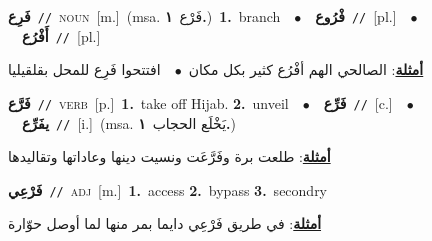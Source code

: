 \documentclass[10pt,a4paper,twoside]{article} %
\begin{document}
\begin{multicols}{2}
{\setlength\topsep{0pt}\textbf{\foreignlanguage{arabic}{فَرِع}}\ {\color{gray}\texttt{//}\color{black}}\ \textsc{noun}\ [m.]\ \color{gray}(msa. \foreignlanguage{arabic}{فَرْع}~\foreignlanguage{arabic}{\textbf{١.}})\color{black}\ \textbf{1.}~branch\ \ $\bullet$\ \ \setlength\topsep{0pt}\textbf{\foreignlanguage{arabic}{فْرُوع}}\ {\color{gray}\texttt{//}\color{black}}\ [pl.]\ \ $\bullet$\ \ \setlength\topsep{0pt}\textbf{\foreignlanguage{arabic}{أَفْرُع}}\ {\color{gray}\texttt{//}\color{black}}\ [pl.]\  \begin{flushright}\color{gray}\foreignlanguage{arabic}{\textbf{\underline{\foreignlanguage{arabic}{أمثلة}}}: الصالحي الهم أفْرُع كثير بكل مكان\ $\bullet$\ \  افتتحوا فَرِع للمحل بقلقيليا}\end{flushright}\color{black}} \vspace{2mm}

{\setlength\topsep{0pt}\textbf{\foreignlanguage{arabic}{فَرَّع}}\ {\color{gray}\texttt{//}\color{black}}\ \textsc{verb}\ [p.]\ \textbf{1.}~take off Hijab.  \textbf{2.}~unveil\ \ $\bullet$\ \ \setlength\topsep{0pt}\textbf{\foreignlanguage{arabic}{فَرِّع}}\ {\color{gray}\texttt{//}\color{black}}\ [c.]\ \ $\bullet$\ \ \setlength\topsep{0pt}\textbf{\foreignlanguage{arabic}{يفَرِّع}}\ {\color{gray}\texttt{//}\color{black}}\ [i.]\ \color{gray}(msa. \foreignlanguage{arabic}{يَخْلَع الحجاب}~\foreignlanguage{arabic}{\textbf{١.}})\color{black}\  \begin{flushright}\color{gray}\foreignlanguage{arabic}{\textbf{\underline{\foreignlanguage{arabic}{أمثلة}}}: طلعت برة وفَرَّعَت ونسيت دينها وعاداتها وتقاليدها}\end{flushright}\color{black}} \vspace{2mm}

{\setlength\topsep{0pt}\textbf{\foreignlanguage{arabic}{فَرْعِي}}\ {\color{gray}\texttt{//}\color{black}}\ \textsc{adj}\ [m.]\ \textbf{1.}~access  \textbf{2.}~bypass  \textbf{3.}~secondry\  \begin{flushright}\color{gray}\foreignlanguage{arabic}{\textbf{\underline{\foreignlanguage{arabic}{أمثلة}}}: في طريق فَرْعِي دايما بمر منها لما أوصل حوّارة}\end{flushright}\color{black}} \vspace{2mm}


\end{multicols}
\end{document}
